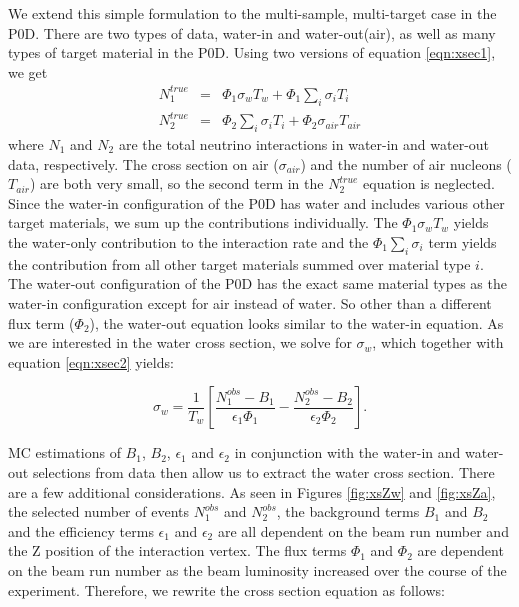 We extend this simple formulation to the multi-sample, multi-target
case in the P0D. There are two types of data, water-in and water-out(air), as
well as many types of target material in the P0D. Using two versions of
equation \ref{eqn:xsec1}, we get
\begin{eqnarray}
N^{true}_1 &=& \Phi_1 \sigma_w T_w + \Phi_1 \sum\limits_{i}\sigma_i
T_i \nonumber \\
N^{true}_2 &=& \Phi_2 \sum\limits_{i}\sigma_i T_i + \Phi_2 \sigma_{air} T_{air}\nonumber
\label{eqn:xsec4}
\end{eqnarray}
\noindent where $N_1$ and $N_2$ are the total neutrino interactions in water-in
and water-out data, respectively. The cross section on air ($\sigma_{air}$) and the number of air nucleons ($T_{air}$) are both very small, so the second term in the $N^{true}_2$ equation is neglected. Since the water-in configuration of the P0D
has water and includes various other target materials, we sum up the
contributions individually. The $\Phi_1 \sigma_w T_w$ yields the
water-only contribution to the interaction rate and the $\Phi_1
\sum\limits_{i}\sigma_i$ term yields the contribution from all other
target materials summed over material type $i$. The water-out configuration
of the P0D has the exact same material types as the water-in
configuration except for air instead of water. So other than a different flux term
($\Phi_2$), the water-out equation looks similar to the water-in
equation. As we are interested in the water cross section, we solve
for $\sigma_w$, which together with equation \ref{eqn:xsec2} yields:

\begin{equation}
\sigma_w = \frac{1}{T_w}\left[\frac{N^{obs}_1-B_1}{\epsilon_1
    \Phi_1}-\frac{N^{obs}_2-B_2}{\epsilon_2\Phi_2}\right].
\label{eqn:xsec5}
\end{equation}

MC estimations of $B_1$, $B_2$, $\epsilon_1$ and $\epsilon_2$
in conjunction with the water-in and water-out selections from data then
allow us to extract the water cross section. There are a few additional considerations. As seen in Figures \ref{fig:xsZw} and \ref{fig:xsZa}, the selected number of events $N^{obs}_1$ and $N^{obs}_2$, the background terms $B_1$ and $B_2$ and the efficiency terms $\epsilon_1$ and $\epsilon_2$ are all dependent on the beam run number and the Z position of the interaction vertex. The flux terms $\Phi_1$ and $\Phi_2$ are dependent on the beam run number as the beam luminosity increased over the course of the experiment. Therefore, we rewrite the cross section equation as follows:

